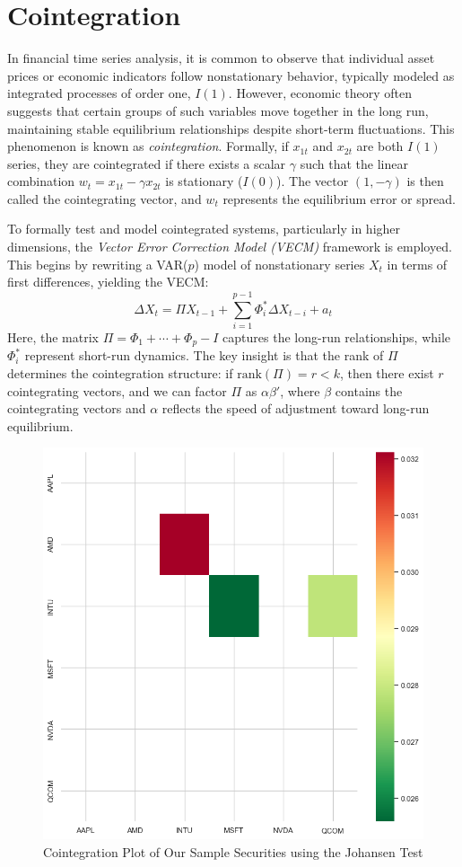 \section{Cointegration}

In financial time series analysis, it is common to observe that individual asset prices or economic indicators follow nonstationary behavior, typically modeled as integrated processes of order one, \( I(1) \). However, economic theory often suggests that certain groups of such variables move together in the long run, maintaining stable equilibrium relationships despite short-term fluctuations. This phenomenon is known as \textit{cointegration}. Formally, if \( x_{1t} \) and \( x_{2t} \) are both \( I(1) \) series, they are cointegrated if there exists a scalar \( \gamma \) such that the linear combination \( w_t = x_{1t} - \gamma x_{2t} \) is stationary (\( I(0) \)). The vector \( (1, -\gamma) \) is then called the cointegrating vector, and \( w_t \) represents the equilibrium error or spread.

To formally test and model cointegrated systems, particularly in higher dimensions, the \textit{Vector Error Correction Model (VECM)} framework is employed. This begins by rewriting a VAR(\(p\)) model of nonstationary series \( X_t \) in terms of first differences, yielding the VECM:
\begin{equation}
	\Delta X_t = \Pi X_{t-1} + \sum_{i=1}^{p-1} \Phi_i^* \Delta X_{t-i} + a_t
\end{equation}
Here, the matrix \( \Pi = \Phi_1 + \cdots + \Phi_p - I \) captures the long-run relationships, while \( \Phi_i^* \) represent short-run dynamics. The key insight is that the rank of \( \Pi \) determines the cointegration structure: if \( \text{rank}(\Pi) = r < k \), then there exist \( r \) cointegrating vectors, and we can factor \( \Pi \) as \( \alpha \beta' \), where \( \beta \) contains the cointegrating vectors and \( \alpha \) reflects the speed of adjustment toward long-run equilibrium.

\begin{figure}[!h]
	\centering
	\includegraphics[width=0.5\linewidth]{content/plots/engle_granger.png}
	\caption{Cointegration Plot of Our Sample Securities using the Johansen Test}
	\label{fig:engle_granger}
\end{figure}

